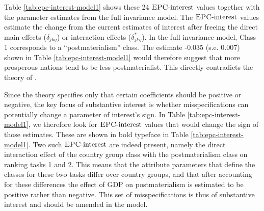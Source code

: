 \documentclass[letterpaper,12pt]{article}
\newcommand{\da}{\textrm{{\sc {EPC}}-interest}}
\begin{document}
Table \ref{tab:epc-interest-model1} shows these 24 $\da{}$ values together with the parameter estimates from the full invariance model. The $\da{}$ values estimate the change from the current estimates of interest after freeing the direct main effects ($\delta_{jkg}$) or interaction effects ($\delta^*_{jkg}$). In the full invariance model, Class 1 corresponds to a ``postmaterialism'' class. The estimate -0.035 (s.e. 0.007) shown in Table \ref{tab:epc-interest-model1} would therefore suggest that more prosperous nations tend to be less postmaterialist. This directly contradicts the theory of \citet{inglehart2010changing}.

Since the theory specifies only that certain coefficients should be positive or negative, the key focus of substantive interest is whether misspecifications can potentially change a parameter of interest's sign. In Table \ref{tab:epc-interest-model1}, we therefore look for $\da{}$ values that would change the sign of those estimates. These are shown in bold typeface in Table \ref{tab:epc-interest-model1}. Two such $\da{}$ are indeed present, namely the direct interaction effect of the country group class with the postmaterialism class on ranking tasks 1 and 2.  This means that the attribute parameters that define the classes for these two tasks differ over country groups, and that after accounting for these differences the effect of GDP on postmaterialism is estimated to be positive rather than negative. This set of misspecifications is thus of substantive interest and should be amended in the model. 
\end{document}
